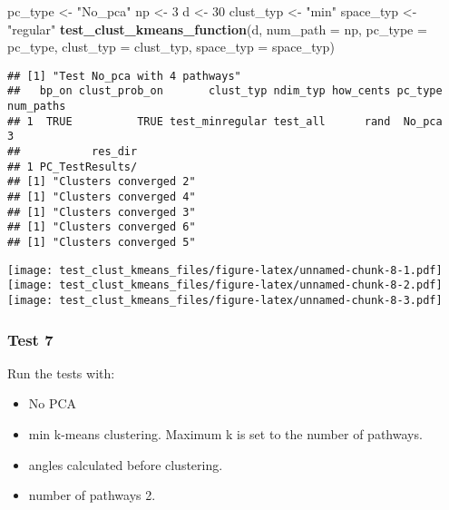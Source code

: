 \documentclass[
]{article}
\newenvironment{Shaded}{\begin{snugshade}}{\end{snugshade}}
\newcommand{\AttributeTok}[1]{\textcolor[rgb]{0.13,0.29,0.53}{#1}}
\newcommand{\DecValTok}[1]{\textcolor[rgb]{0.00,0.00,0.81}{#1}}
\newcommand{\FunctionTok}[1]{\textcolor[rgb]{0.13,0.29,0.53}{\textbf{#1}}}
\newcommand{\NormalTok}[1]{#1}
\newcommand{\OtherTok}[1]{\textcolor[rgb]{0.56,0.35,0.01}{#1}}
\newcommand{\StringTok}[1]{\textcolor[rgb]{0.31,0.60,0.02}{#1}}
\providecommand{\tightlist}{%
  \setlength{\itemsep}{0pt}\setlength{\parskip}{0pt}}
\begin{document}
\begin{Shaded}
\begin{Highlighting}[]
\NormalTok{pc\_type }\OtherTok{\textless{}{-}} \StringTok{"No\_pca"}
\NormalTok{np }\OtherTok{\textless{}{-}} \DecValTok{3}
\NormalTok{d }\OtherTok{\textless{}{-}} \DecValTok{30}
\NormalTok{clust\_typ }\OtherTok{\textless{}{-}} \StringTok{"min"}
\NormalTok{space\_typ }\OtherTok{\textless{}{-}} \StringTok{"regular"}
\FunctionTok{test\_clust\_kmeans\_function}\NormalTok{(d,}
                           \AttributeTok{num\_path =}\NormalTok{ np,}
                           \AttributeTok{pc\_type =}\NormalTok{ pc\_type,}
                           \AttributeTok{clust\_typ =}\NormalTok{ clust\_typ,}
                           \AttributeTok{space\_typ =}\NormalTok{ space\_typ)}
\end{Highlighting}
\end{Shaded}

\begin{verbatim}
## [1] "Test No_pca with 4 pathways"
##   bp_on clust_prob_on       clust_typ ndim_typ how_cents pc_type num_paths
## 1  TRUE          TRUE test_minregular test_all      rand  No_pca         3
##           res_dir
## 1 PC_TestResults/
## [1] "Clusters converged 2"
## [1] "Clusters converged 4"
## [1] "Clusters converged 3"
## [1] "Clusters converged 6"
## [1] "Clusters converged 5"
\end{verbatim}

\texttt{[image: test\_clust\_kmeans\_files/figure-latex/unnamed-chunk-8-1.pdf]}
\texttt{[image: test\_clust\_kmeans\_files/figure-latex/unnamed-chunk-8-2.pdf]}
\texttt{[image: test\_clust\_kmeans\_files/figure-latex/unnamed-chunk-8-3.pdf]}

\hypertarget{test-7}{%
\subsubsection{Test 7}\label{test-7}}

Run the tests with:

\begin{itemize}
\tightlist
\item
  No PCA
\item
  min k-means clustering. Maximum k is set to the number of pathways.
\item
  angles calculated before clustering.
\item
  number of pathways 2.
\end{itemize}
\end{document}
